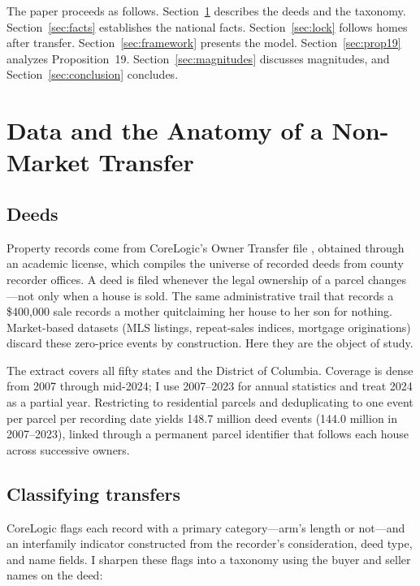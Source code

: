 \documentclass[12pt, letterpaper]{article}
\begin{document}
The paper proceeds as follows. Section~\ref{sec:data} describes the deeds
and the taxonomy. Section~\ref{sec:facts} establishes the national facts.
Section~\ref{sec:lock} follows homes after transfer. Section~\ref{sec:framework}
presents the model. Section~\ref{sec:prop19} analyzes Proposition~19.
Section~\ref{sec:magnitudes} discusses magnitudes, and
Section~\ref{sec:conclusion} concludes.

\section{Data and the Anatomy of a Non-Market Transfer}\label{sec:data}

\subsection{Deeds}

Property records come from CoreLogic's Owner Transfer file
\citep{corelogic_data}, obtained through an academic license, which compiles
the universe of recorded deeds from county recorder offices. A deed is filed
whenever the legal ownership of a parcel changes---not only when a house is
sold. The same administrative trail that records a \$400,000 sale records a
mother quitclaiming her house to her son for nothing. Market-based datasets
(MLS listings, repeat-sales indices, mortgage originations) discard these
zero-price events by construction. Here they are the object of study.

The extract covers all fifty states and the District of Columbia. Coverage
is dense from 2007 through mid-2024; I use 2007--2023 for annual statistics
and treat 2024 as a partial year. Restricting to residential parcels and
deduplicating to one event per parcel per recording date yields 148.7 million
deed events (144.0 million in 2007--2023), linked through a permanent parcel
identifier that follows each house across successive owners.

\subsection{Classifying transfers}

CoreLogic flags each record with a primary category---arm's length or
not---and an interfamily indicator constructed from the recorder's
consideration, deed type, and name fields. I sharpen these flags into a
taxonomy using the buyer and seller names on the deed:
\end{document}
